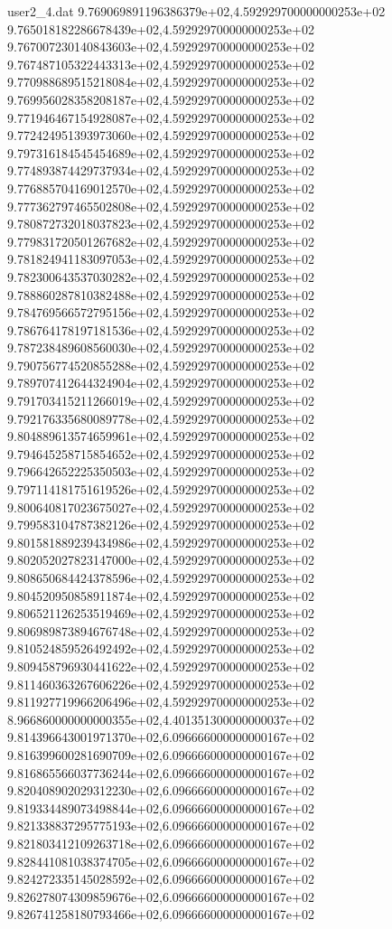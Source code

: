 \begin{filecontents}{user2_4.dat}
9.769069891196386379e+02,4.592929700000000253e+02
9.765018182286678439e+02,4.592929700000000253e+02
9.767007230140843603e+02,4.592929700000000253e+02
9.767487105322443313e+02,4.592929700000000253e+02
9.770988689515218084e+02,4.592929700000000253e+02
9.769956028358208187e+02,4.592929700000000253e+02
9.771946467154928087e+02,4.592929700000000253e+02
9.772424951393973060e+02,4.592929700000000253e+02
9.797316184545454689e+02,4.592929700000000253e+02
9.774893874429737934e+02,4.592929700000000253e+02
9.776885704169012570e+02,4.592929700000000253e+02
9.777362797465502808e+02,4.592929700000000253e+02
9.780872732018037823e+02,4.592929700000000253e+02
9.779831720501267682e+02,4.592929700000000253e+02
9.781824941183097053e+02,4.592929700000000253e+02
9.782300643537030282e+02,4.592929700000000253e+02
9.788860287810382488e+02,4.592929700000000253e+02
9.784769566572795156e+02,4.592929700000000253e+02
9.786764178197181536e+02,4.592929700000000253e+02
9.787238489608560030e+02,4.592929700000000253e+02
9.790756774520855288e+02,4.592929700000000253e+02
9.789707412644324904e+02,4.592929700000000253e+02
9.791703415211266019e+02,4.592929700000000253e+02
9.792176335680089778e+02,4.592929700000000253e+02
9.804889613574659961e+02,4.592929700000000253e+02
9.794645258715854652e+02,4.592929700000000253e+02
9.796642652225350503e+02,4.592929700000000253e+02
9.797114181751619526e+02,4.592929700000000253e+02
9.800640817023675027e+02,4.592929700000000253e+02
9.799583104787382126e+02,4.592929700000000253e+02
9.801581889239434986e+02,4.592929700000000253e+02
9.802052027823147000e+02,4.592929700000000253e+02
9.808650684424378596e+02,4.592929700000000253e+02
9.804520950858911874e+02,4.592929700000000253e+02
9.806521126253519469e+02,4.592929700000000253e+02
9.806989873894676748e+02,4.592929700000000253e+02
9.810524859526492492e+02,4.592929700000000253e+02
9.809458796930441622e+02,4.592929700000000253e+02
9.811460363267606226e+02,4.592929700000000253e+02
9.811927719966206496e+02,4.592929700000000253e+02
8.966860000000000355e+02,4.401351300000000037e+02
9.814396643001971370e+02,6.096666000000000167e+02
9.816399600281690709e+02,6.096666000000000167e+02
9.816865566037736244e+02,6.096666000000000167e+02
9.820408902029312230e+02,6.096666000000000167e+02
9.819334489073498844e+02,6.096666000000000167e+02
9.821338837295775193e+02,6.096666000000000167e+02
9.821803412109263718e+02,6.096666000000000167e+02
9.828441081038374705e+02,6.096666000000000167e+02
9.824272335145028592e+02,6.096666000000000167e+02
9.826278074309859676e+02,6.096666000000000167e+02
9.826741258180793466e+02,6.096666000000000167e+02

\end{filecontents}
